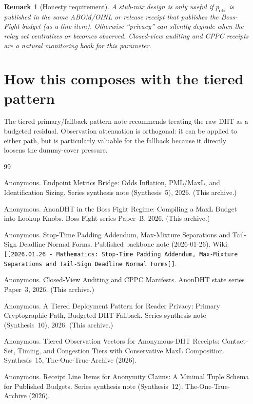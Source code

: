 \documentclass[11pt]{article}
\newtheorem{remark}{Remark}
\theoremstyle{definition}
\begin{document}
\begin{remark}[Honesty requirement]
A stub-mix design is only useful if $p_{\mathrm{obs}}$ is published in the same ABOM/OINL or release receipt that publishes the Boss-Fight budget (as a line item).\cite{series:receiptitems}
Otherwise ``privacy'' can silently degrade when the relay set centralizes or becomes observed.
Closed-view auditing and CPPC receipts are a natural monitoring hook for this parameter.\cite{series:state3}
\end{remark}

\section{How this composes with the tiered pattern}
The tiered primary/fallback pattern note recommends treating the raw DHT as a budgeted residual.\cite{series:tieredpattern}
Observation attenuation is orthogonal: it can be applied to either path, but is particularly valuable for the fallback because it directly loosens the dummy-cover pressure.

\begin{thebibliography}{99}\small

Anonymous.
\newblock Endpoint Metrics Bridge: Odds Inflation, PML/MaxL, and Identification Sizing.
\newblock Series synthesis note (Synthesis~5), 2026. (This archive.)

Anonymous.
\newblock AnonDHT in the Boss Fight Regime: Compiling a MaxL Budget into Lookup Knobs.
\newblock Boss Fight series Paper~B, 2026. (This archive.)


Anonymous.
\newblock Stop-Time Padding Addendum, Max-Mixture Separations and Tail-Sign Deadline Normal Forms.
\newblock Published backbone note (2026-01-26). Wiki: \texttt{[[2026.01.26 - Mathematics: Stop-Time Padding Addendum, Max-Mixture Separations and Tail-Sign Deadline Normal Forms]]}.

Anonymous.
\newblock Closed-View Auditing and CPPC Manifests.
\newblock AnonDHT state series Paper~3, 2026. (This archive.)

Anonymous.
\newblock A Tiered Deployment Pattern for Reader Privacy: Primary Cryptographic Path, Budgeted DHT Fallback.
\newblock Series synthesis note (Synthesis~10), 2026. (This archive.)


Anonymous.
\newblock Tiered Observation Vectors for Anonymous-DHT Receipts: Contact-Set, Timing, and Congestion Tiers with Conservative MaxL Composition.
\newblock Synthesis~15, The-One-True-Archive (2026).

Anonymous.
\newblock Receipt Line Items for Anonymity Claims: A Minimal Tuple Schema for Published Budgets.
\newblock Series synthesis note (Synthesis~12), The-One-True-Archive (2026).

\end{thebibliography}
\end{document}
